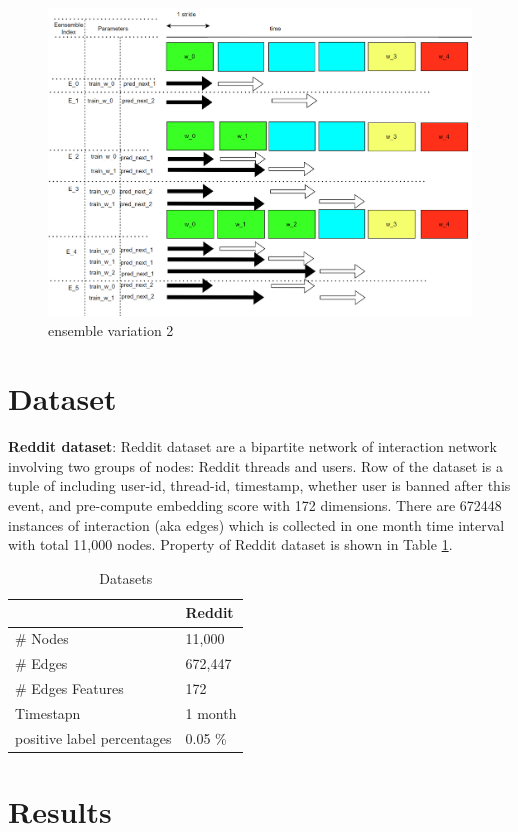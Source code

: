 \documentclass{IEEEtran}
\begin{document}
\begin{figure}[htbp]
\centering
\includegraphics[width=.9\linewidth]{./images/screenshot_20220425_110823.png}
\caption{\label{ensemble_variation_2}ensemble variation 2}
\end{figure}
\section{Dataset}
\label{sec:orgd63d25d}
\textbf{Reddit dataset}: Reddit dataset are a bipartite network of interaction network involving two groups of nodes: Reddit threads and users. Row of the dataset is a tuple of including user-id, thread-id, timestamp, whether user is banned after this event, and pre-compute embedding score with 172 dimensions. There are 672448 instances of interaction (aka edges) which is collected in one month time interval with total 11,000 nodes. Property of Reddit dataset is shown in Table \ref{Datasets}.

\begin{table}[htbp]
\caption{\label{Datasets}Datasets}
\centering
\begin{tabular}{ll}
\hline
\hline
 & Reddit\\
\hline
\# Nodes & 11,000\\
\# Edges & 672,447\\
\# Edges Features & 172\\
Timestapn & 1 month\\
positive label percentages & 0.05 \%\\
\end{tabular}
\end{table}
\section{Results}
\label{sec:org1c53960}
\printbibliography
\end{document}
